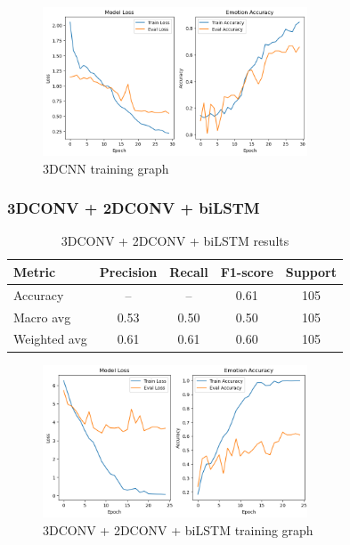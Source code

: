 \documentclass{article}
\begin{document}
\begin{figure}[H]
  \begin{center}
    \includegraphics*[width=0.7\textwidth]{Figures/Picture7.png}
  \end{center}
  \caption{3DCNN training graph}
  \label{fig:fig7}
\end{figure}

\subsubsection{3DCONV + 2DCONV + biLSTM}

\begin{table}[H]
\centering
\caption{3DCONV + 2DCONV + biLSTM results}
\begin{tabular}{|l|c|c|c|c|}
\hline
\textbf{Metric} & \textbf{Precision} & \textbf{Recall} & \textbf{F1-score} & \textbf{Support} \\
\hline
Accuracy       & --   & --   & 0.61 & 105 \\
Macro avg      & 0.53 & 0.50 & 0.50 & 105 \\
Weighted avg   & 0.61 & 0.61 & 0.60 & 105 \\
\hline
\end{tabular}%
\label{tab:table4}
\end{table}

\begin{figure}[H]
  \begin{center}
    \includegraphics*[width=0.7\textwidth]{Figures/Picture8.png}
  \end{center}
  \caption{3DCONV + 2DCONV + biLSTM training graph}
  \label{fig:fig8}
\end{figure}
\end{document}
